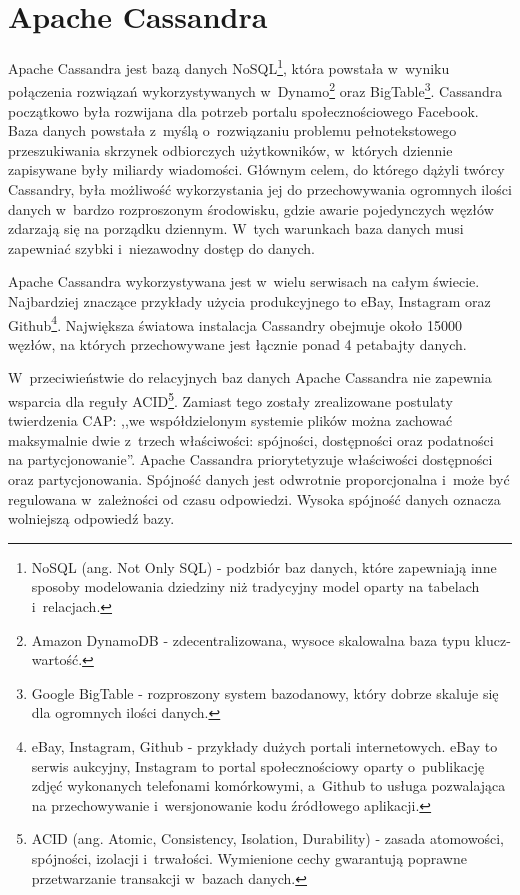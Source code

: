 
\chapter{Apache Cassandra}
\label{chap:apache_cassandra}

Apache Cassandra jest bazą danych NoSQL\footnote{NoSQL (ang. Not Only SQL) - podzbiór baz danych, które zapewniają inne sposoby modelowania dziedziny niż tradycyjny model oparty na tabelach i~relacjach.}, która powstała w~wyniku połączenia rozwiązań wykorzystywanych w~Dynamo\footnote{Amazon DynamoDB - zdecentralizowana, wysoce skalowalna baza typu klucz-wartość.} oraz BigTable\footnote{Google BigTable - rozproszony system bazodanowy, który dobrze skaluje się dla ogromnych ilości danych.}. Cassandra początkowo była rozwijana dla potrzeb portalu społecznościowego Facebook. Baza danych powstała z~myślą o~rozwiązaniu problemu pełnotekstowego przeszukiwania skrzynek odbiorczych użytkowników, w~których dziennie zapisywane były miliardy wiadomości. Głównym celem, do którego dążyli twórcy Cassandry, była możliwość wykorzystania jej do przechowywania ogromnych ilości danych w~bardzo rozproszonym środowisku, gdzie awarie pojedynczych węzłów zdarzają się na porządku dziennym. W~tych warunkach baza danych musi zapewniać szybki i~niezawodny dostęp do danych. \cite{cassandra_introduction} 

Apache Cassandra wykorzystywana jest w~wielu serwisach na całym świecie. Najbardziej znaczące przykłady użycia produkcyjnego to eBay, Instagram oraz Github\footnote{eBay, Instagram, Github - przykłady dużych portali internetowych. eBay to serwis aukcyjny, Instagram to portal społecznościowy oparty o~publikację zdjęć wykonanych telefonami komórkowymi, a~Github to usługa pozwalająca na przechowywanie i~wersjonowanie kodu źródłowego aplikacji.}. Największa światowa instalacja Cassandry obejmuje około 15000 węzłów, na których przechowywane jest łącznie ponad 4 petabajty danych. \cite{official_cassandra}

W~przeciwieństwie do relacyjnych baz danych Apache Cassandra nie zapewnia wsparcia dla reguły ACID\footnote{ACID (ang. Atomic, Consistency, Isolation, Durability) - zasada atomowości, spójności, izolacji i~trwałości. Wymienione cechy gwarantują poprawne przetwarzanie transakcji w~bazach danych.}. Zamiast tego zostały zrealizowane postulaty twierdzenia CAP: ,,we współdzielonym systemie plików można zachować maksymalnie dwie z~trzech właściwości: spójności, dostępności oraz podatności na partycjonowanie''. \cite{cap_theorem} Apache Cassandra priorytetyzuje właściwości dostępności oraz partycjonowania. Spójność danych jest odwrotnie proporcjonalna i~może być regulowana w~zależności od czasu odpowiedzi. Wysoka spójność danych oznacza wolniejszą odpowiedź bazy.

